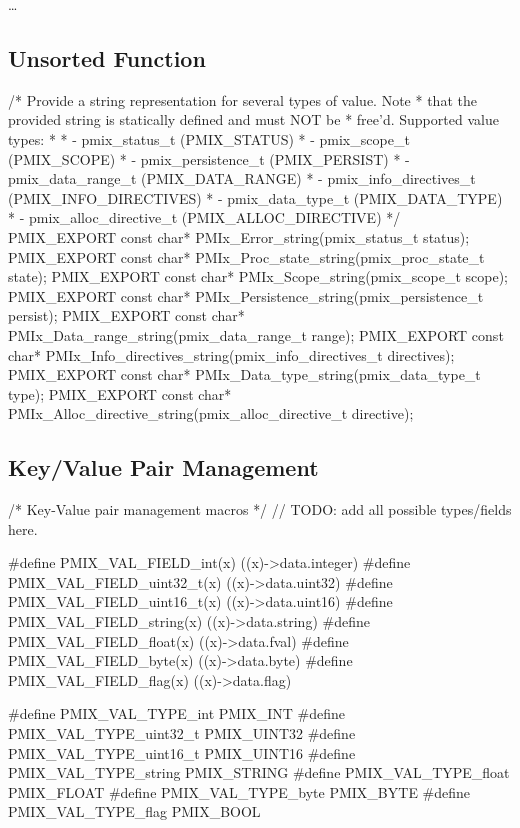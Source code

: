 \ldots

\subsection{Unsorted Function}

\cspecificstart
\begin{codepar}
/* Provide a string representation for several types of value. Note
 * that the provided string is statically defined and must NOT be
 * free'd. Supported value types:
 *
 * - pmix_status_t (PMIX_STATUS)
 * - pmix_scope_t   (PMIX_SCOPE)
 * - pmix_persistence_t  (PMIX_PERSIST)
 * - pmix_data_range_t   (PMIX_DATA_RANGE)
 * - pmix_info_directives_t   (PMIX_INFO_DIRECTIVES)
 * - pmix_data_type_t   (PMIX_DATA_TYPE)
 * - pmix_alloc_directive_t  (PMIX_ALLOC_DIRECTIVE)
 */
PMIX_EXPORT const char* PMIx_Error_string(pmix_status_t status);
PMIX_EXPORT const char* PMIx_Proc_state_string(pmix_proc_state_t state);
PMIX_EXPORT const char* PMIx_Scope_string(pmix_scope_t scope);
PMIX_EXPORT const char* PMIx_Persistence_string(pmix_persistence_t persist);
PMIX_EXPORT const char* PMIx_Data_range_string(pmix_data_range_t range);
PMIX_EXPORT const char* PMIx_Info_directives_string(pmix_info_directives_t directives);
PMIX_EXPORT const char* PMIx_Data_type_string(pmix_data_type_t type);
PMIX_EXPORT const char* PMIx_Alloc_directive_string(pmix_alloc_directive_t directive);
\end{codepar}
\cspecificend






\subsection{Key/Value Pair Management}


\cspecificstart
\begin{codepar}
/* Key-Value pair management macros */
// TODO: add all possible types/fields here.

#define PMIX_VAL_FIELD_int(x)       ((x)->data.integer)
#define PMIX_VAL_FIELD_uint32_t(x)  ((x)->data.uint32)
#define PMIX_VAL_FIELD_uint16_t(x)  ((x)->data.uint16)
#define PMIX_VAL_FIELD_string(x)    ((x)->data.string)
#define PMIX_VAL_FIELD_float(x)     ((x)->data.fval)
#define PMIX_VAL_FIELD_byte(x)      ((x)->data.byte)
#define PMIX_VAL_FIELD_flag(x)      ((x)->data.flag)

#define PMIX_VAL_TYPE_int      PMIX_INT
#define PMIX_VAL_TYPE_uint32_t PMIX_UINT32
#define PMIX_VAL_TYPE_uint16_t PMIX_UINT16
#define PMIX_VAL_TYPE_string   PMIX_STRING
#define PMIX_VAL_TYPE_float    PMIX_FLOAT
#define PMIX_VAL_TYPE_byte     PMIX_BYTE
#define PMIX_VAL_TYPE_flag     PMIX_BOOL
\end{codepar}
\cspecificend


